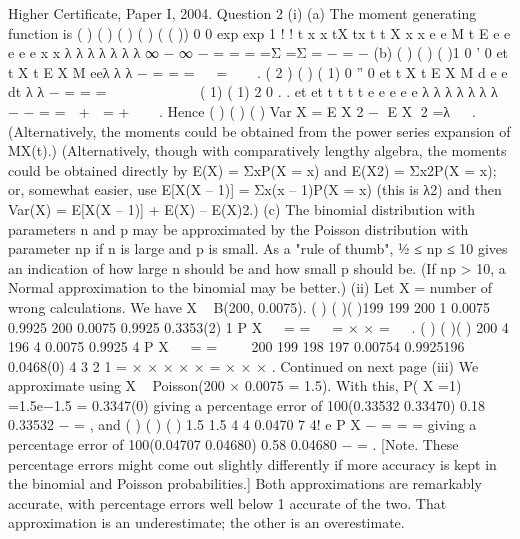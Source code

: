 Higher Certificate, Paper I, 2004. Question 2
(i) (a) The moment generating function is
( ) ( ) ( ) ( ) ( ( ))
0 0
exp exp 1
! !
t x x
tX tx t t
X
x x
e e M t E e e e e e
x x
λ
λ λ λ λ λ λ
∞ − ∞
−
= =
= =Σ =Σ = − = −
(b) ( ) ( ) ( )1
0
' 0
et t
X
t
E X M eeλ
λ λ −
=
= =   =  
.
( 2 ) ( ) ( 1)
0
'' 0
et t
X
t
E X M d e e
dt
λ λ −
=
= =         
( 1) ( 1) 2
0
. .
et et t t t
t
e e e e e λ λ λ λ λ λ λ − −
=
=  +  = +  
.
Hence ( ) ( ) ( ) Var X = E X 2 − E X 2 =λ   .
(Alternatively, the moments could be obtained from the power series
expansion of MX(t).)
(Alternatively, though with comparatively lengthy algebra, the
moments could be obtained directly by E(X) = ΣxP(X = x) and E(X2) =
Σx2P(X = x); or, somewhat easier, use E[X(X – 1)] = Σx(x – 1)P(X = x)
(this is λ2) and then Var(X) = E[X(X – 1)] + E(X) – {E(X)}2.)
(c) The binomial distribution with parameters n and p may be
approximated by the Poisson distribution with parameter np if n is
large and p is small. As a "rule of thumb", ½ ≤ np ≤ 10 gives an
indication of how large n should be and how small p should be. (If
np > 10, a Normal approximation to the binomial may be better.)
(ii) Let X = number of wrong calculations. We have X ~ B(200, 0.0075).
( ) ( )( )199 199 200
1 0.0075 0.9925 200 0.0075 0.9925 0.3353(2)
1
P X
 
= =   = × × =
 
.
( ) ( )( ) 200 4 196
4 0.0075 0.9925
4
P X
 
= = 
 
200 199 198 197 0.00754 0.9925196 0.0468(0)
4 3 2 1
= × × × × × =
× × ×
.
Continued on next page
(iii) We approximate using X ~ Poisson(200 × 0.0075 = 1.5). With this,
P( X =1) =1.5e−1.5 = 0.3347(0)
giving a percentage error of 100(0.33532 0.33470)
0.18%
0.33532
−
= , and
( ) ( ) ( )
1.5 1.5 4
4 0.0470 7
4!
e
P X
−
= = =
giving a percentage error of 100(0.04707 0.04680)
0.58%
0.04680
−
= .
[Note. These percentage errors might come out slightly differently if more
accuracy is kept in the binomial and Poisson probabilities.]
Both approximations are remarkably accurate, with percentage errors well
below 1%
accurate of the two. That approximation is an underestimate; the other is an
overestimate.
